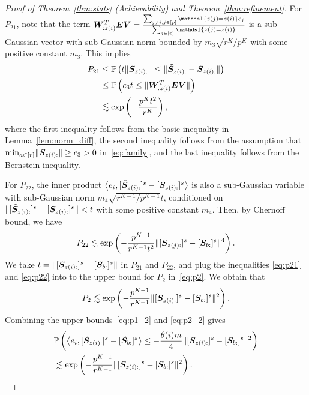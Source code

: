\documentclass[journal]{IEEEtran}
\theoremstyle{definition}
\theoremstyle{definition}
\newcommand{\of}[1]{\left(#1\right)}
\newcommand{\ang}[1]{\left\langle#1\right\rangle}
\begin{document}
\begin{proof}[Proof of Theorem~\ref{thm:stats} (Achievability) and Theorem~\ref{thm:refinement}]
    For $P_{21}$, note that the term $\mW^T_{: z(i)} \mE \mV = \frac{ \sum_{ j \neq i, j \in [p]} \ind \{ z(j) = z(i) \} e_j }{\sum_{j \in [p]} \ind \{ z(j) = z(i) \} }$  is a sub-Gaussian vector with sub-Gaussian norm bounded by $m_3 \sqrt{r^K/ p^K}$ with some positive constant $m_3$. This implies
        \begin{align}
        P_{21} & \leq \bbP\of{ t \onormSize{}{\mS_{z(i):} } \leq \onormSize{}{ \tilde  \mS_{z(i):}  -  \mS_{z(i):} }  }\\
        & \leq \bbP\of{c_3 t \leq  \onormSize{}{ \mW^T_{: z(i)} \mE \mV  } } \\
        &\lesssim \exp\of{ - \frac{p^K t^2}{r^K} }, \label{eq:p21}
    \end{align}
    where the first inequality follows from the basic inequality in Lemma~\ref{lem:norm_diff}, the second inequality follows from the assumption that $ \min_{a \in [r]} \lVert\bm S_{z(i):}\rVert \geq c_3>0$ in~\eqref{eq:family}, and the last inequality follows from the Bernstein inequality.
    
    For $P_{22}$, the inner product $ \ang{e_i, [ \tilde  \mS_{z(i):} ]^s - [ \mS_{z(i):} ]^s}$ is also a sub-Gaussian variable with sub-Gaussian norm $ m_4 \sqrt{ r^{K-1}/ p^{K-1} } t$, conditioned on $\lVert [ \tilde  {\bm S}_{z(i):} ]^s - [ \bm S_{z(i):} ]^s \rVert < t$ with some positive constant $m_4$. Then, by Chernoff bound, we have 
    \begin{equation}\label{eq:p22}
        P_{22} \lesssim \exp \of{  - \frac{p^{K-1}}{r^{K-1} t^2}   \onormSize{}{ [ \mS_{z(j):}  ]^s - [ \mS_{b:}  ]^s  }^4 }. 
    \end{equation}
    We take $t =  \lVert [ \bm S_{z(i):}  ]^s - [ \bm S_{b:}  ]^s  \rVert$ in $P_{21}$ and $P_{22}$, and plug the inequalities \eqref{eq:p21} and \eqref{eq:p22} into to the upper bound for $P_2$ in~\eqref{eq:p2}. We obtain that 
    \begin{equation}\label{eq:p2_2}
        P_2 \lesssim \exp \of{  - \frac{p^{K-1}}{r^{K-1}}   \onormSize{}{ [ \mS_{z(i):}  ]^s - [ \mS_{b:}  ]^s  }^2 }.
    \end{equation}
    Combining the upper bounds~\eqref{eq:p1_2} and \eqref{eq:p2_2} gives 
    \begin{align}
        &\bbP \of{ \ang{ e_i, [  \tilde \mS_{z(i):} ]^s - [  \tilde \mS_{b:} ]^s }  \leq - \frac{\theta(i) m}{4} \onormSize{}{ [ \mS_{z(i):}  ]^s - [ \mS_{b:}  ]^s  }^2} \\
        & \lesssim  \exp \of{  - \frac{p^{K-1}}{r^{K-1}}   \onormSize{}{ [ \mS_{z(i):}  ]^s - [ \mS_{b:}  ]^s  }^2 }.\label{eq:xi_p}
    \end{align}


\end{proof}
\end{document}
